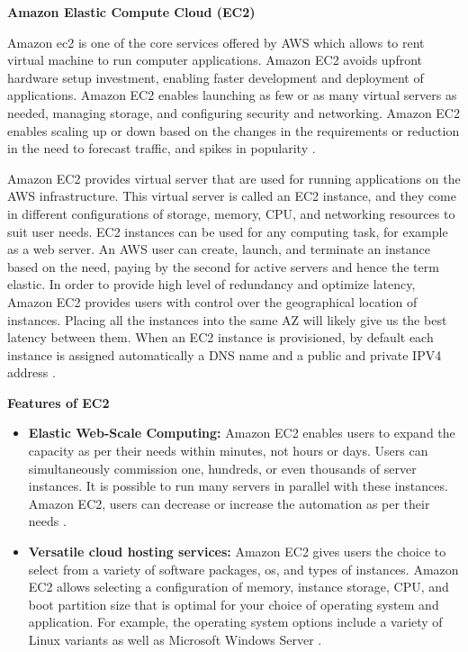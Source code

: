 \textbf{Amazon Elastic Compute Cloud (EC2)}

\par Amazon \gls{ec2} is one of the core services offered by
AWS
which
allows to rent virtual machine to run computer
applications.
Amazon EC2 avoids upfront hardware setup investment, enabling faster development and deployment of applications.
Amazon EC2 enables launching as few or as many virtual servers as needed, managing storage, and configuring security and networking.
Amazon EC2 enables scaling up or down based on the
changes in the requirements or reduction in the need to forecast traffic, and spikes in popularity \cite{29}.

\par Amazon EC2 provides virtual server that are used for
running applications on the AWS infrastructure.
This
virtual server is called an EC2 instance, and they come
in different configurations of storage, memory, CPU, and networking resources to suit user needs.
EC2 instances can be used for any computing task, for example as a web server.
An AWS user can create, launch, and terminate an instance based on the need, paying by the second for active servers and hence the term elastic.
In order to provide high level of redundancy and optimize latency, Amazon EC2 provides users with control over the geographical location of instances.
Placing all the instances into the same AZ will likely give us the best latency between them.
When an EC2 instance is provisioned, by default each instance is assigned automatically a DNS name and a public and private IPV4 address \cite{30}.


\textbf{Features of EC2}
\begin{itemize}
    \item \textbf{Elastic Web-Scale Computing:} Amazon EC2 enables users to expand the capacity as per their needs within minutes, not hours or days.
    Users can simultaneously commission one, hundreds, or even thousands of server instances.
    It is possible to run many servers in
    parallel
    with these instances.
    Amazon EC2, users can decrease or increase the
    automation as per their needs \cite{31}.
\end{itemize}

\begin{itemize}
    \item \textbf{Versatile cloud hosting services:} Amazon EC2 gives users the choice to select from a variety of software packages, os, and types of instances.
    Amazon EC2 allows selecting a configuration of memory, instance storage, CPU, and boot partition size that is optimal for your choice of operating system and application. For example, the operating system options include a variety of Linux variants as well as Microsoft Windows Server \cite{29}.
\end{itemize}


